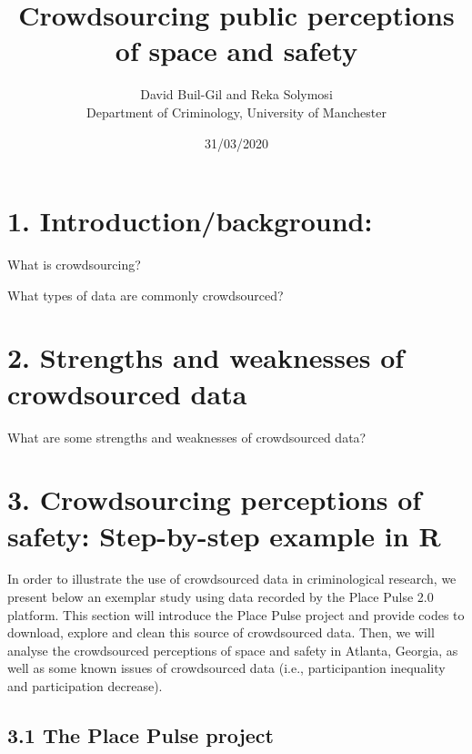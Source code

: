 \documentclass[
]{article}
\title{Crowdsourcing public perceptions of space and safety}
\author{David Buil-Gil and Reka Solymosi\\
Department of Criminology, University of Manchester}
\date{31/03/2020}
\begin{document}
\maketitle

\hypertarget{introductionbackground}{%
\section{1. Introduction/background:}\label{introductionbackground}}

What is crowdsourcing?

What types of data are commonly crowdsourced?

\hypertarget{strengths-and-weaknesses-of-crowdsourced-data}{%
\section{2. Strengths and weaknesses of crowdsourced
data}\label{strengths-and-weaknesses-of-crowdsourced-data}}

What are some strengths and weaknesses of crowdsourced data?

\hypertarget{crowdsourcing-perceptions-of-safety-step-by-step-example-in-r}{%
\section{3. Crowdsourcing perceptions of safety: Step-by-step example in
R}\label{crowdsourcing-perceptions-of-safety-step-by-step-example-in-r}}

In order to illustrate the use of crowdsourced data in criminological
research, we present below an exemplar study using data recorded by the
Place Pulse 2.0 platform. This section will introduce the Place Pulse
project and provide codes to download, explore and clean this source of
crowdsourced data. Then, we will analyse the crowdsourced perceptions of
space and safety in Atlanta, Georgia, as well as some known issues of
crowdsourced data (i.e., participantion inequality and participation
decrease).

\hypertarget{the-place-pulse-project}{%
\subsection{3.1 The Place Pulse project}\label{the-place-pulse-project}}
\end{document}
